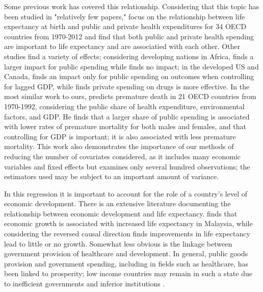 \documentclass[12pt]{article}
\begin{document}
        Some previous work has covered this relationship. Considering that this topic has been studied in "relatively few papers," \cite{linden_life_2017} focus on the relationship between life expectancy at birth and public and private health expenditures for 34 OECD countries from 1970-2012 and find that both public and private health spending are important to life expectancy and are associatied with each other. Other studies find a variety of effects; considering developing nations in Africa, \cite{novignon_effects_2012} finds a larger impact for public spending while \cite{filmer_impact_1999} finds no impact; in the developed US and Canada, \cite{lichtenberg_sources_2005} finds an impact only for public spending on outcomes when controlling for lagged GDP, while \cite{cremieux_public_2005} finds private spending on drugs is more effective. In the most similar work to ours, \cite{or_determinants_2000} predicts premature death in 21 OECD countries from 1970-1992, considering the public share of health expenditure, environmental factors, and GDP. He finds that a larger share of public spending is associated with lower rates of premature mortality for both males and females, and that controlling for GDP is important; it is also associated with less premature mortality. This work also demonstrates the importance of our methods of reducing the number of covariates considered, as it includes many economic variables and fixed effects but examines only several hundred observations; the estimators used may be subject to an important amount of variance.

        In this regression it is important to account for the role of a country's level of economic development. There is an extensive literature documenting the relationship between economic development and life expectancy. \cite{ling_testing_2017} finds that economic growth is associated with increased life expectancy in Malaysia, while considering the reversed causal direction \cite{acemoglu_disease_2007} finds improvements in life expectancy lead to little or no growth. Somewhat less obvious is the linkage between government provision of healthcare and development. In general, public goods provision and government spending, including in fields such as healthcare, has been linked to prosperity; low income countries may remain in such a state due to inefficient governments and inferior institutions \citep{wu_impact_2010}.
\end{document}
